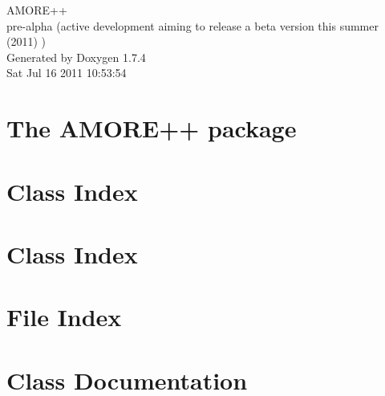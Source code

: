 \documentclass[a4paper]{book}
\begin{document}
\hypersetup{pageanchor=false}
\begin{titlepage}
\vspace*{7cm}
\begin{center}
{\Large AMORE++ \\[1ex]\large pre-\/alpha (active development aiming to release a beta version this summer (2011) ) }\\
\vspace*{1cm}
{\large Generated by Doxygen 1.7.4}\\
\vspace*{0.5cm}
{\small Sat Jul 16 2011 10:53:54}\\
\end{center}
\end{titlepage}
\clearemptydoublepage
{}
\tableofcontents
\clearemptydoublepage
{}
\hypersetup{pageanchor=true}
\chapter{The AMORE++ package}
\label{index}\hypertarget{index}{}
\chapter{Class Index}

\chapter{Class Index}

\chapter{File Index}

\chapter{Class Documentation}






















\end{document}
